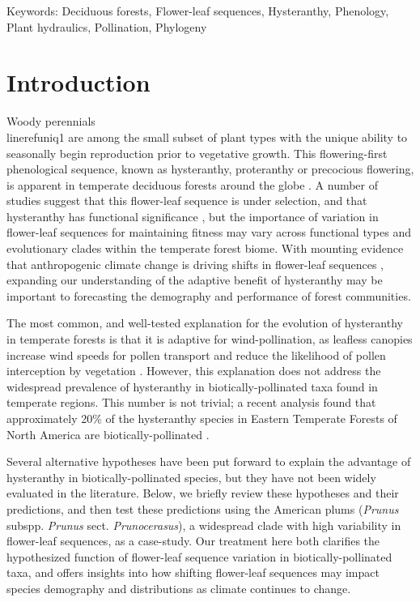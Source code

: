 \documentclass{article}[12pt]
\begin{document}
Keywords: Deciduous forests, Flower-leaf sequences, Hysteranthy, Phenology, Plant hydraulics, Pollination, Phylogeny

\pagebreak
\section*{Introduction}
\noindent Woody perennials\\lineref{uniq1} are among the small subset of plant types with the unique ability to seasonally begin reproduction prior to vegetative growth. This flowering-first phenological sequence, known as hysteranthy, proteranthy or precocious flowering, is apparent in temperate deciduous forests around the globe \citep{Rathcke_1985}. A number of studies suggest that this flower-leaf sequence is under selection, and that hysteranthy has functional significance \citep{Gougherty2018,Buonaiuto2020,Guo2014}, but the importance of variation in flower-leaf sequences for maintaining fitness may vary across functional types and evolutionary clades within the temperate forest biome. With mounting evidence that anthropogenic climate change is driving shifts in flower-leaf sequences \citep{Ma:2021tf,Wang:2022wt}, expanding our understanding of the adaptive benefit of hysteranthy may be important to forecasting the demography and performance of forest communities.

\noindent The most common, and well-tested explanation for the evolution of hysteranthy in temperate forests is that it is adaptive for wind-pollination, as leafless canopies increase wind speeds for pollen transport and reduce the likelihood of pollen interception by vegetation \citep{Whitehead1969,Niklas1985}. However, this explanation does not address the widespread prevalence of hysteranthy in biotically-pollinated taxa found in temperate regions. This number is not trivial; a recent analysis found that approximately 20\% of the hysteranthy species in Eastern Temperate Forests of North America are biotically-pollinated \citep{Buonaiuto2020}. 

Several alternative hypotheses have been put forward to explain the advantage of hysteranthy in biotically-pollinated species, but they have not been widely evaluated in the literature. Below, we briefly review these hypotheses and their predictions, and then test these predictions using the American plums (\textit{Prunus} subspp. \textit{Prunus} sect. \textit{Prunocerasus}), a widespread clade with high variability in flower-leaf sequences, as a case-study. Our treatment here both clarifies the hypothesized function of flower-leaf sequence variation in biotically-pollinated taxa, and offers insights into how shifting flower-leaf sequences may impact species demography and distributions as climate continues to change.
\end{document}

